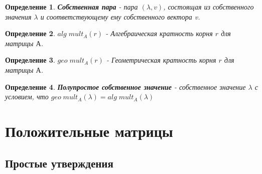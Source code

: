 \documentclass[a4paper,12pt,leqno]{article} %
\newtheorem{definition}{Определение}
\begin{document}
\begin{definition}
    \textbf{Собственная пара} - пара $(\lambda, v)$, состоящая из собственного значения $\lambda$
     и соответствующему ему собственного вектора v.
\end{definition}

\begin{definition}
    \textbf{$alg \; mult_A(r)$} - Алгебраическая кратность корня $r$ для матрицы $А$.
\end{definition}

\begin{definition}
    \textbf{$geo \; mult_A(r)$} - Геометрическая кратность корня $r$ для матрицы $А$.
\end{definition}

\begin{definition}
    \textbf{Полупростое собственное значение} - собственное значение $\lambda$ с условием,
     что $geo \; mult_A(\lambda) = alg \; mult_A(\lambda)$
\end{definition}


\pagebreak

\section*{Положительные матрицы}
\subsection*{Простые утверждения}
\end{document}
